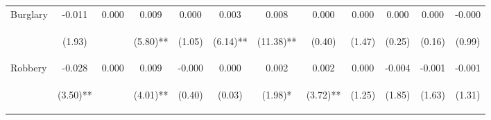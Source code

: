 \begin{tabular}{lccccccccccc}
\noalign{\smallskip}Burglary & -0.011 & 0.000 & 0.009 & 0.000 & 0.003 & 0.008 & 0.000 & 0.000 & 0.000 & 0.000 & -0.000\\
 & \begin{footnotesize}(1.93)\end{footnotesize} & \begin{footnotesize}\end{footnotesize} & \begin{footnotesize}(5.80)**\end{footnotesize} & \begin{footnotesize}(1.05)\end{footnotesize} & \begin{footnotesize}(6.14)**\end{footnotesize} & \begin{footnotesize}(11.38)**\end{footnotesize} & \begin{footnotesize}(0.40)\end{footnotesize} & \begin{footnotesize}(1.47)\end{footnotesize} & \begin{footnotesize}(0.25)\end{footnotesize} & \begin{footnotesize}(0.16)\end{footnotesize} & \begin{footnotesize}(0.99)\end{footnotesize}\\
\noalign{\smallskip}Robbery & -0.028 & 0.000 & 0.009 & -0.000 & 0.000 & 0.002 & 0.002 & 0.000 & -0.004 & -0.001 & -0.001\\
 & \begin{footnotesize}(3.50)**\end{footnotesize} & \begin{footnotesize}\end{footnotesize} & \begin{footnotesize}(4.01)**\end{footnotesize} & \begin{footnotesize}(0.40)\end{footnotesize} & \begin{footnotesize}(0.03)\end{footnotesize} & \begin{footnotesize}(1.98)*\end{footnotesize} & \begin{footnotesize}(3.72)**\end{footnotesize} & \begin{footnotesize}(1.25)\end{footnotesize} & \begin{footnotesize}(1.85)\end{footnotesize} & \begin{footnotesize}(1.63)\end{footnotesize} & \begin{footnotesize}(1.31)\end{footnotesize}\\

\end{tabular}

